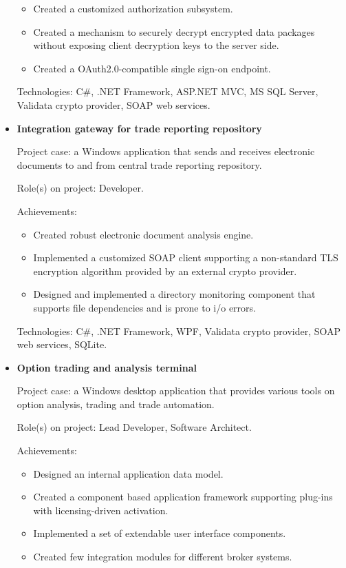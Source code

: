 \documentclass{article}
\begin{document}
\begin{itemize}
{            \begin{itemize}
                \item Created a customized authorization subsystem. 
                \item Created a mechanism to securely decrypt encrypted data packages without exposing client decryption keys to the server side.
                \item Created a OAuth2.0-compatible single sign-on endpoint.
            \end{itemize}
        
        Technologies: C\#, .NET Framework, ASP.NET MVC, MS SQL Server, Validata crypto provider, SOAP web services.
    }
    \item {
        \textbf{Integration gateway for trade reporting repository}
        
        Project case: a Windows application that sends and receives electronic documents to and from central trade reporting repository.
        
        Role(s) on project: Developer.
        
        Achievements:
        
            \begin{itemize}
                \item Created robust electronic document analysis engine.
                \item Implemented a customized SOAP client supporting a non-standard TLS encryption algorithm provided by an external crypto provider.
                \item Designed and implemented a directory monitoring component that supports file dependencies and is prone to i/o errors.
            \end{itemize}
        
        Technologies: C\#, .NET Framework, WPF, Validata crypto provider, SOAP web services, SQLite.
    }
    \item {
        \textbf{Option trading and analysis terminal}
        
        Project case: a Windows desktop application that provides various tools on option analysis, trading and trade automation.
        
        Role(s) on project: Lead Developer, Software Architect.
        
        Achievements:
        
            \begin{itemize}
                \item Designed an internal application data model.
                \item Created a component based application framework supporting plug-ins with licensing-driven activation.
                \item Implemented a set of extendable user interface components.
                \item Created few integration modules for different broker systems.
            \end{itemize}
        
}
\end{itemize}
\end{document}
